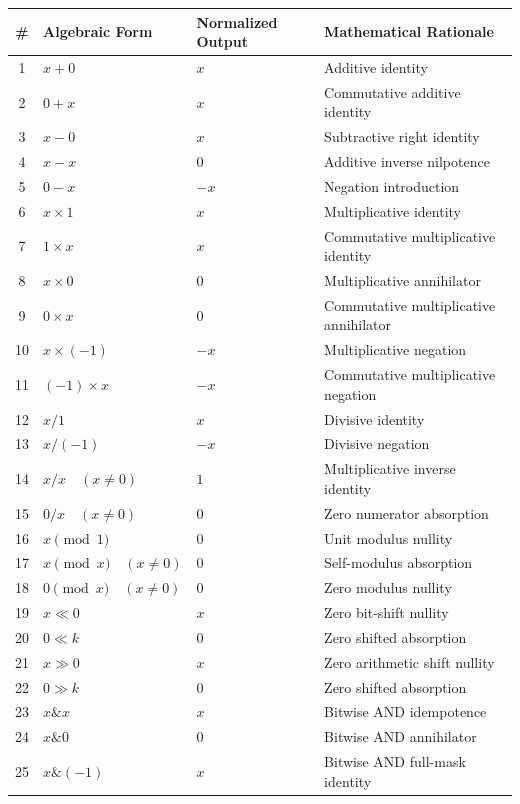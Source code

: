 \begin{table}[h!]
\centering
\small
\begin{tabular}{clll}
\toprule
\textbf{\#} & \textbf{Algebraic Form} & \textbf{Normalized Output} & \textbf{Mathematical Rationale} \\
\midrule
1 & $x + 0$ & $x$ & Additive identity \\
2 & $0 + x$ & $x$ & Commutative additive identity \\
3 & $x - 0$ & $x$ & Subtractive right identity \\
4 & $x - x$ & $0$ & Additive inverse nilpotence \\
5 & $0 - x$ & $-x$ & Negation introduction \\
6 & $x \times 1$ & $x$ & Multiplicative identity \\
7 & $1 \times x$ & $x$ & Commutative multiplicative identity \\
8 & $x \times 0$ & $0$ & Multiplicative annihilator \\
9 & $0 \times x$ & $0$ & Commutative multiplicative annihilator \\
10 & $x \times (-1)$ & $-x$ & Multiplicative negation \\
11 & $(-1) \times x$ & $-x$ & Commutative multiplicative negation \\
12 & $x / 1$ & $x$ & Divisive identity \\
13 & $x / (-1)$ & $-x$ & Divisive negation \\
14 & $x / x \quad (x \ne 0)$ & $1$ & Multiplicative inverse identity \\
15 & $0 / x \quad (x \ne 0)$ & $0$ & Zero numerator absorption \\
16 & $x \pmod 1$ & $0$ & Unit modulus nullity \\
17 & $x \pmod x \quad (x \ne 0)$ & $0$ & Self-modulus absorption \\
18 & $0 \pmod x \quad (x \ne 0)$ & $0$ & Zero modulus nullity \\
19 & $x \ll 0$ & $x$ & Zero bit-shift nullity \\
20 & $0 \ll k$ & $0$ & Zero shifted absorption \\
21 & $x \gg 0$ & $x$ & Zero arithmetic shift nullity \\
22 & $0 \gg k$ & $0$ & Zero shifted absorption \\
23 & $x \mathbin{\&} x$ & $x$ & Bitwise AND idempotence \\
24 & $x \mathbin{\&} 0$ & $0$ & Bitwise AND annihilator \\
25 & $x \mathbin{\&} (-1)$ & $x$ & Bitwise AND full-mask identity \\

\end{tabular}
\end{table}
